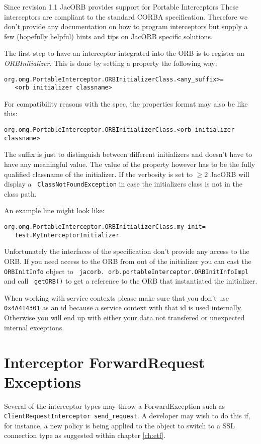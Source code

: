 
Since revision 1.1 JacORB provides support for Portable Interceptors These
interceptors are compliant to the standard CORBA specification.  Therefore we
don't provide any documentation on how to program interceptors but supply a
few (hopefully helpful) hints and tips on JacORB specific solutions.

The first  step to have an  interceptor integrated into the  ORB is to
register an {\em  ORBInitializer}. This is done by  setting a property
the following way:
\begin{verbatim}org.omg.PortableInterceptor.ORBInitializerClass.<any_suffix>=
   <orb initializer classname>
\end{verbatim}

For compatibility reasons with the spec, the properties format may also be
like this:

\begin{verbatim}org.omg.PortableInterceptor.ORBInitializerClass.<orb initializer classname>
\end{verbatim}

The suffix  is just to distinguish between  different initializers and
doesn't have to  have any meaningful value. The  value of the property
however has to be the fully qualified classname of the initializer. If
the  verbosity  is  set  to  $\geq  2$  JacORB  will  display  a  {\tt
ClassNotFoundException} in  case the initializers class is  not in the
class path.

An example line might look like:
\begin{verbatim}org.omg.PortableInterceptor.ORBInitializerClass.my_init=
   test.MyInterceptorInitializer
\end{verbatim}

Unfortunately the  interfaces of  the specification don't  provide any
access to  the ORB.  If  you need  access to the  ORB from out  of the
initializer  you  can  cast  the  {\tt  ORBInitInfo}  object  to  {\tt
jacorb. orb.portableInterceptor.ORBInitInfoImpl}   and   call  {\tt
getORB()}  to  get  a  reference  to the  ORB  that  instantiated  the
initializer.

When working with service contexts please make sure that you don't use {\tt
  0x4A414301} as an id because a service context with that id is used
internally.  Otherwise you will end up with either your data not transfered or
unexpected internal exceptions.

\section{Interceptor ForwardRequest Exceptions}
Several of the interceptor types may throw a ForwardException such as
{\tt ClientRequestInterceptor send\_request}. A developer may wish to do
this if, for instance, a new policy is being applied to the object to switch
to a SSL connection type as suggested within chapter \ref{ch:etf}.


